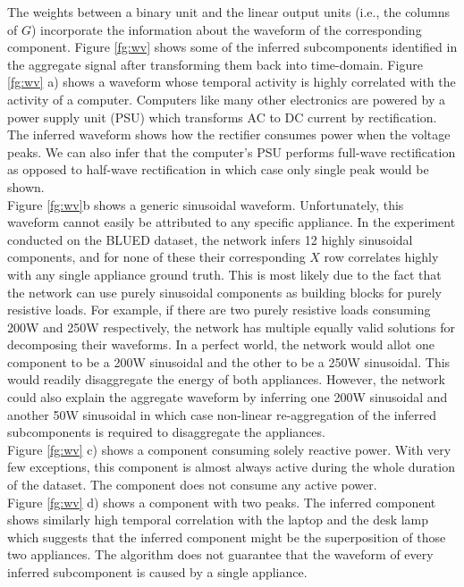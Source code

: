 The weights between a binary unit and the linear output units (i.e., the columns of $G$) incorporate the information about the waveform of the corresponding component. Figure \ref{fg:wv} shows some of the inferred subcomponents identified in the aggregate signal after transforming them back into time-domain. Figure \ref{fg:wv} a) shows a waveform whose temporal activity is highly correlated with the activity of a computer. Computers like many other electronics are powered by a power supply unit (PSU) which transforms AC to DC current by rectification. The inferred waveform shows how the rectifier consumes power when the voltage peaks. We can also infer that the computer's PSU performs full-wave rectification as opposed to half-wave rectification in which case only single peak would be shown.\\

Figure \ref{fg:wv}b shows a generic sinusoidal waveform. Unfortunately, this waveform cannot easily be attributed to any specific appliance. In the experiment conducted on the BLUED dataset, the network infers 12 highly sinusoidal components, and for none of these their corresponding $X$ row correlates highly with any single appliance ground truth. This is most likely due to the fact that the network can use purely sinusoidal components as building blocks for purely resistive loads. For example, if there are two purely resistive loads consuming 200W and 250W respectively, the network has multiple equally valid solutions for decomposing their waveforms. In a perfect world, the network would allot one component to be a 200W sinusoidal and the other to be a 250W sinusoidal. This would readily disaggregate the energy of both appliances. However, the network could also explain the aggregate waveform by inferring one 200W sinusoidal and another 50W sinusoidal in which case non-linear re-aggregation of the inferred subcomponents is required to disaggregate the appliances.\\

Figure \ref{fg:wv} c) shows a component consuming solely reactive power. With very few exceptions, this component is almost always active during the whole duration of the dataset. The component does not consume any active power.\\

Figure \ref{fg:wv} d) shows a component with two peaks. The inferred component shows similarly high temporal correlation with the laptop and the desk lamp which suggests that the inferred component might be the superposition of those two appliances. The algorithm does not guarantee that the waveform of every inferred subcomponent is caused by a single appliance.

